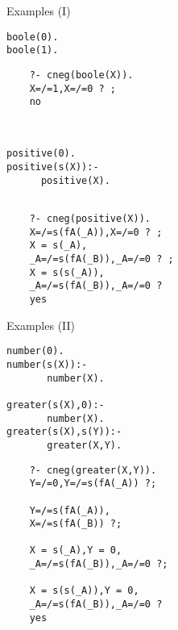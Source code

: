 \documentclass[pdf,slideColor,contemporain]{prosper}
\begin{document}
\begin{slide}{Examples (I)}
\begin{small}

 \begin{minipage}{1.6in}
\begin{verbatim}
boole(0).
boole(1).
\end{verbatim}
\end{minipage}
\begin{minipage}{2in}
{\blue
\begin{verbatim} 
    ?- cneg(boole(X)).
    X=/=1,X=/=0 ? ;
    no
\end{verbatim} 
}%
\end{minipage}\\
\vspace{0.5cm}
\begin{minipage}{1.6in}
\begin{verbatim}
positive(0). 
positive(s(X)):-
      positive(X).  
\end{verbatim}
\end{minipage}
\begin{minipage}{2in}
{\blue
\begin{verbatim} 

    ?- cneg(positive(X)).
    X=/=s(fA(_A)),X=/=0 ? ;
    X = s(_A),
    _A=/=s(fA(_B)),_A=/=0 ? ;
    X = s(s(_A)),
    _A=/=s(fA(_B)),_A=/=0 ? 
    yes
\end{verbatim} 
}%
\end{minipage}

\end{small}

\end{slide}


\begin{slide}{Examples (II)}
\vspace{-0.2cm}
\begin{small}
\begin{minipage}{1.7in}
\begin{verbatim}
number(0).
number(s(X)):-
       number(X).

greater(s(X),0):-
       number(X).
greater(s(X),s(Y)):-
       greater(X,Y).
\end{verbatim}
\end{minipage}
\begin{minipage}{2in}
{\blue
\begin{verbatim} 
    ?- cneg(greater(X,Y)).
    Y=/=0,Y=/=s(fA(_A)) ?;

    Y=/=s(fA(_A)),
    X=/=s(fA(_B)) ?;

    X = s(_A),Y = 0,
    _A=/=s(fA(_B)),_A=/=0 ?;

    X = s(s(_A)),Y = 0,
    _A=/=s(fA(_B)),_A=/=0 ? 
    yes
\end{verbatim} 
}%
\end{minipage}

\end{small}

\end{slide}
\end{document}
